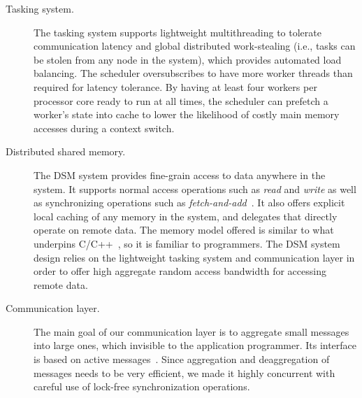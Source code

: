 \begin{description}

\item [Tasking system.] The tasking system supports lightweight multithreading
to tolerate communication latency and global distributed work-stealing (i.e.,
tasks can be stolen from any node in the system), which provides automated
load balancing. The scheduler oversubscribes to have more worker threads than
required for latency tolerance. By having at least four workers per processor
core ready to run at all times, the scheduler can prefetch a worker's state
into cache to lower the likelihood of costly main memory accesses during a
context switch.

\item[Distributed shared memory.] The DSM system provides fine-grain access to
data anywhere in the system. It supports normal access operations such as
\emph{read\/} and \emph{write\/} as well as synchronizing operations such as
\emph{fetch-and-add\/}~\cite{fetchandadd}. It also offers explicit local
caching of any memory in the system, and delegates that directly operate on
remote data. The memory model offered is similar to what underpins
C/C++~\cite{N2480,N2800}, so it is familiar to programmers. The DSM system
design relies on the lightweight tasking system and communication layer in
order to offer high aggregate random access bandwidth for accessing remote
data.

\item[Communication layer.] The main goal of our communication layer is to
aggregate small messages into large ones, which invisible to the application
programmer. Its interface is based on active messages~\cite{vonEicken92}.
Since aggregation and deaggregation of messages needs to be very efficient, we
made it highly concurrent with careful use of lock-free synchronization
operations.

\end{description}
